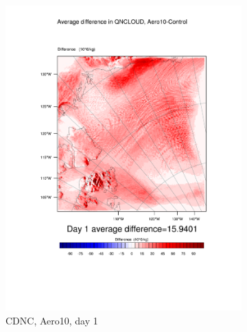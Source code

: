 \begin{figure}[h]
\begin{subfigure}{0.30\textwidth}
		\includegraphics[width=\textwidth]{results/aero10/diff_Aero10_QNCLOUD_Day1.pdf}
		\caption{CDNC, Aero10, day 1}
		\label{subfig:CDNCr3Day1}
	\end{subfigure}
	\quad
	\begin{subfigure}{0.30\textwidth}
		\centering

\end{subfigure}
\end{figure}
